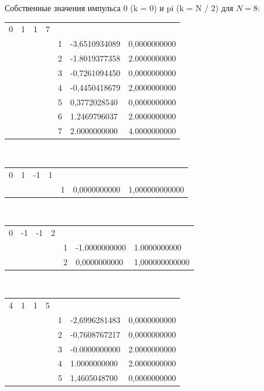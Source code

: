 \documentclass[11pt]{article}
\begin{document}
Собственные значения импульса 0 (k = 0) и pi (k = N / 2) для $N = 8$:\\

\begin{tabular}{lllllll}    
    0 & 1 & 1 & 7 & & & \\
    & & & & 1 &-3,6510934089 & 0,0000000000 \\
    & & & & 2 & -1.8019377358 & 2.0000000000 \\
    & & & & 3 & -0,7261094450 & 0,0000000000 \\
    & & & & 4 & -0,4450418679 & 2,0000000000 \\
    & & & & 5 & 0,3772028540 & 0,0000000000 \\
    & & & & 6 & 1.2469796037 & 2.0000000000 \\
    & & & & 7 & 2.0000000000 & 4.0000000000 \\
\end{tabular} \\  

\begin{tabular}{lllllll}    
    0 & 1 & -1 & 1 & & & \\
    & & & & 1 & 0,0000000000 & 1,000000000000 \\
\end{tabular} \\  

\begin{tabular}{lllllll}    
    
    0 & -1 & -1 & 2  & & & \\
    & & & & 1 & -1.0000000000 & 1.0000000000 \\
    & & & & 2 & 0,0000000000 & 1,000000000000 \\
\end{tabular} \\  

\begin{tabular}{lllllll}    
    4 & 1 & 1 & 5 & & & \\
    & & & & 1 & -2,6996281483 & 0,0000000000 \\
    & & & & 2 & -0,7608767217 & 0,0000000000 \\
    & & & & 3 & -0.0000000000 & 2.0000000000 \\
    & & & & 4 & 1.0000000000 & 2.0000000000 \\
    & & & & 5 & 1,4605048700 & 0,0000000000 \\
\end{tabular} \\  
\end{document}
